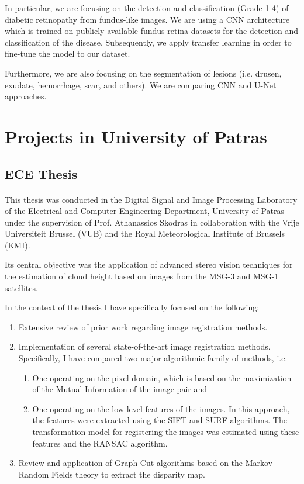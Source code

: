 \documentclass{article}
\begin{document}
In particular, we are focusing on the detection and classification (Grade 1-4) of diabetic retinopathy from fundus-like images. We are using a CNN architecture which is trained on publicly available fundus retina datasets for the detection and classification of the disease. Subsequently, we apply transfer learning in order to fine-tune the model to our dataset.

Furthermore, we are also focusing on the segmentation of lesions (i.e. drusen, exudate, hemorrhage, scar, and others). We are comparing CNN and U-Net approaches.


\section{Projects in University of Patras}

\subsection{ECE Thesis}
\paragraph{}
This thesis was conducted in the Digital Signal and Image Processing Laboratory of the Electrical and Computer Engineering Department, University of Patras under the supervision of Prof. Athanassios Skodras in collaboration with the Vrije Universiteit Brussel (VUB) and the Royal Meteorological Institute of Brussels (KMI). \vspace{4pt}

Its central objective was the application of advanced stereo vision techniques for the estimation of cloud height based on images from the MSG-3 and MSG-1 satellites. \vspace{4pt}

In the context of the thesis I have specifically focused on the following:
\begin{enumerate}
    \item Extensive review of prior work regarding image registration methods.
    \item Implementation of several state-of-the-art image registration methods. Specifically, I have compared two major algorithmic family of methods, i.e.
    \begin{enumerate}
        \item One operating on the pixel domain, which is based on the maximization of the Mutual Information of the image pair and
        \item One operating on the low-level features of the images. In this approach, the features were extracted using the SIFT and SURF algorithms. The transformation model for registering the images was estimated using these features and the RANSAC algorithm.
    \end{enumerate}
    \item  Review and application of Graph Cut algorithms based on the Markov Random Fields theory to extract the disparity map.
\end{enumerate}



\end{document}
